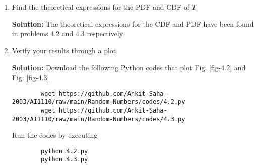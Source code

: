 \documentclass[journal,12pt,twocolumn]{IEEEtran}
\newcommand{\solution}{\noindent \textbf{Solution: }}
\numberwithin{equation}{section}
\renewcommand\thesection{\arabic{section}}
\begin{document}
\begin{enumerate}[label=\thesection.\arabic*,ref=\thesection.\theenumi]
	\item Find the theoretical expressions for the PDF and CDF of $T$
	
	\solution The theoretical expressions for the CDF and PDF have been found in problems 4.2 and 4.3 respectively

	\item Verify your results through a plot
	
	\solution Download the following Python codes that plot Fig. \ref{fig-4.2} and Fig. \ref{fig-4.3}
	\begin{lstlisting}
		wget https://github.com/Ankit-Saha-2003/AI1110/raw/main/Random-Numbers/codes/4.2.py
		wget https://github.com/Ankit-Saha-2003/AI1110/raw/main/Random-Numbers/codes/4.3.py
	\end{lstlisting}
	Run the codes by executing
	\begin{lstlisting}
		python 4.2.py
		python 4.3.py
	\end{lstlisting}
	
	
	\end{enumerate}
	
\end{document}
